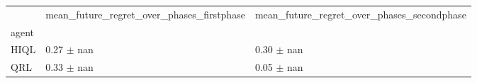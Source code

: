 \begin{tabular}{lll}
\toprule
 & mean_future_regret_over_phases_firstphase & mean_future_regret_over_phases_secondphase \\
agent &  &  \\
\midrule
HIQL & 0.27 $\pm$ nan & 0.30 $\pm$ nan \\
QRL & 0.33 $\pm$ nan & 0.05 $\pm$ nan \\
\bottomrule
\end{tabular}
